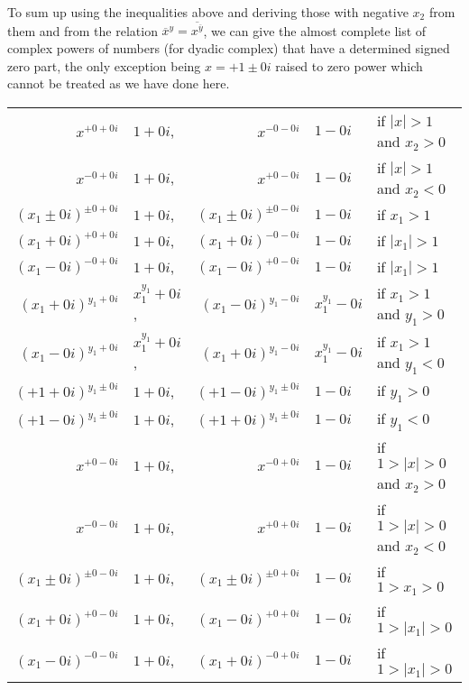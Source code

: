\documentclass {article}
\begin{document}
To sum up using the inequalities above and deriving those with negative $x_2$
from them and from the relation $\overline{x}^y =
\overline{x^{\overline{y}}}$, we can give the almost complete list of complex
powers of numbers (for dyadic complex) that have a determined signed zero
part, the only exception being $x=+1 \pm 0i$ raised to zero power which cannot
be treated as we have done here.

\begin{tabular}{r@{ $=$ }lr@{ $=$ }ll}
  $x^{+0 +0i}$ & $1 +0i$,&
  $x^{-0 -0i}$ & $1 -0i$ &
  if $|x|>1$ and $x_2>0$\\
  $x^{-0 +0i}$ & $1 +0i$,&
  $x^{+0 -0i}$ & $1 -0i$ &
  if $|x|>1$ and $x_2<0$\\

  $(x_1 \pm 0i)^{\pm0 +0i}$ & $1 +0i$,&
  $(x_1 \pm 0i)^{\pm0 -0i}$ & $1 -0i$ &
  if $x_1>1$\\

  $(x_1 +0i)^{+0 +0i}$ & $1 +0i$, &
  $(x_1 +0i)^{-0 -0i}$ & $1 -0i$ &
  if $|x_1|>1$\\
  $(x_1 -0i)^{-0 +0i}$ & $1 +0i$, &
  $(x_1 -0i)^{+0 -0i}$ & $1 -0i$ &
  if $|x_1|>1$\\

  $(x_1 +0i)^{y_1 +0i}$ & $x_1^{y_1} +0i$, &
  $(x_1 -0i)^{y_1 -0i}$ & $x_1^{y_1} -0i$ &
  if $x_1>1$ and $y_1>0$\\
  $(x_1 -0i)^{y_1 +0i}$ & $x_1^{y_1} +0i$, &
  $(x_1 +0i)^{y_1 -0i}$ & $x_1^{y_1} -0i$ &
  if $x_1>1$ and $y_1<0$\\

  $(+1 +0i)^{y_1 \pm0i}$ & $1 +0i$, &
  $(+1 -0i)^{y_1 \pm0i}$ & $1 -0i$ &
  if $y_1>0$\\
  $(+1 -0i)^{y_1 \pm0i}$ & $1 +0i$, &
  $(+1 +0i)^{y_1 \pm0i}$ & $1 -0i$ &
  if $y_1<0$\\

  $x^{+0 -0i}$ & $1 +0i$, &
  $x^{-0 +0i}$ & $1 -0i$ &
  if $1>|x|>0$ and $x_2>0$\\
  $x^{-0 -0i}$ & $1 +0i$, &
  $x^{+0 +0i}$ & $1 -0i$ &
  if $1>|x|>0$ and $x_2<0$\\

  $(x_1 \pm0i)^{\pm0 -0i}$ & $1 +0i$, &
  $(x_1 \pm0i)^{\pm0 +0i}$ & $1 -0i$ &
  if $1 > x_1 > 0$ \\

  $(x_1 +0i)^{+0 -0i}$ & $1 +0i$, &
  $(x_1 -0i)^{+0 +0i}$ & $1 -0i$ &
  if $1 > |x_1| > 0$ \\
  $(x_1 -0i)^{-0 -0i}$ & $1 +0i$, &
  $(x_1 +0i)^{-0 +0i}$ & $1 -0i$ &
  if $1 > |x_1| > 0$ \\


\end{tabular}
\end{document}
